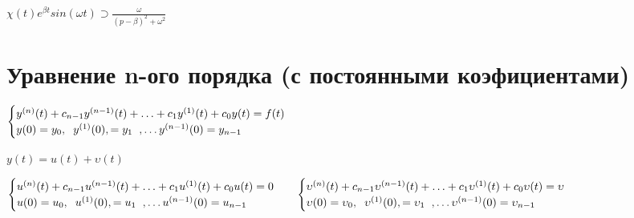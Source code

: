 \begin{Large}

\vspace{0.5cm}
$
\chi (t)e^{\beta t} sin(\omega t) 
\supset
\frac{\omega}{(p-\beta)^2 + \omega^2}
$


\end{Large}

\vspace{0.5cm}
\section{Уравнение n-ого порядка (с постоянными коэфициентами)}

\vspace{0.5cm}
\begin{Large}
$
\begin{cases}
	y^{(n)}(t) + c_{n-1}y^{(n-1)}(t)+\ldots + c_1y^{(1)}(t) +c_0y(t) = f(t) \\
	y(0) = y_0, \text{\hspace{0.2cm}} y^{(1)}(0), = y_1 \text{\hspace{0.2cm}}, \ldots y^{(n-1)}(0) = y_{n-1}
\end{cases}
$


\vspace{0.5cm}
\begin{center}
$
y(t) = u(t) + \upsilon(t)
$
\end{center}


\end{Large}

\begin{normalsize}
$\\
\begin{matrix}
	\begin{cases}
		u^{(n)}(t) + c_{n-1}u^{(n-1)}(t)+\ldots + c_1u^{(1)}(t) +c_0u(t) = 0 \\
		u(0) = u_0, \text{\hspace{0.2cm}} u^{(1)}(0), = u_1 \text{\hspace{0.2cm}}, \ldots 			u^{(n-1)}(0) = u_{n-1}
	\end{cases}
	&
	\begin{cases}
		\upsilon^{(n)}(t) + c_{n-1}\upsilon^{(n-1)}(t)+\ldots + c_1\upsilon^{(1)}(t) +c_0\upsilon (t) = \upsilon \\
		\upsilon(0) = \upsilon_0, \text{\hspace{0.2cm}} \upsilon^{(1)}(0), = \upsilon_1 \text{\hspace{0.2cm}}, \ldots 			\upsilon^{(n-1)}(0) = \upsilon_{n-1}
	\end{cases}
\end{matrix}
$

\end{normalsize}

